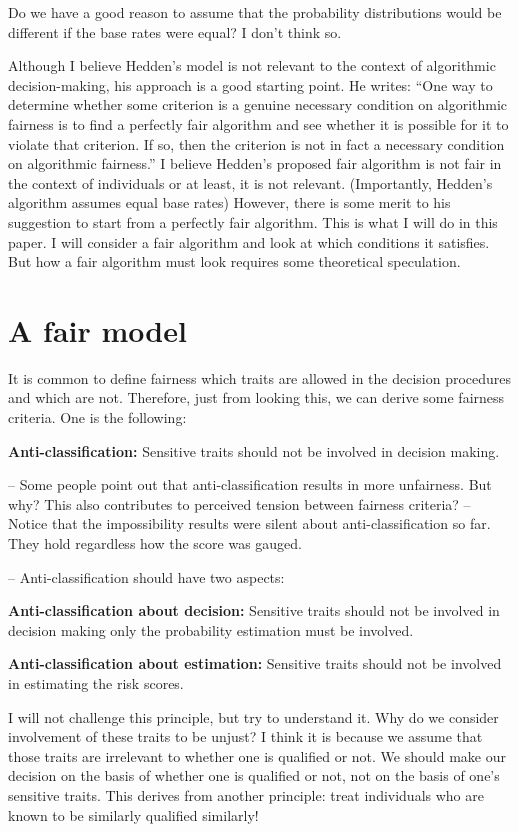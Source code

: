 \documentclass{article}
\begin{document}
Do we have a good reason to assume that the probability distributions would be different if the base rates were equal? I don't think so. 


Although I believe Hedden's model is not relevant to the context of algorithmic decision-making, his approach is a good starting point. He writes: “One way to determine whether some criterion is a genuine necessary condition on algorithmic fairness is to find a perfectly fair algorithm and see whether it is possible for it to violate that criterion. If so, then the criterion is not in fact a necessary condition on algorithmic fairness.” I believe Hedden’s proposed fair algorithm is not fair in the context of individuals or at least, it is not relevant. (Importantly, Hedden’s algorithm assumes equal base rates) However, there is some merit to his suggestion to start from a perfectly fair algorithm. This is what I will do in this paper. I will consider a fair algorithm and look at which conditions it satisfies. But how a fair algorithm must look requires some theoretical speculation.


\section{A fair model}

It is common to define fairness which traits are allowed in the decision procedures and which are not. Therefore, just from looking this, we can derive some fairness criteria. One is the following: 

 \textbf{Anti-classification:} Sensitive traits should not be involved in decision making. 

-- Some people point out that anti-classification results in more unfairness. But why? This also contributes to perceived tension between fairness criteria? 
-- Notice that the impossibility results were silent about anti-classification so far. They hold regardless how the score was gauged. 

-- Anti-classification should have two aspects:

\textbf{Anti-classification about decision:} Sensitive traits should not be involved in decision making only the probability estimation must be involved.

\textbf{Anti-classification about estimation:} Sensitive traits should not be involved in estimating the risk scores. 

I will not challenge this principle, but try to understand it. Why do we consider involvement of these traits to be unjust? I think it is because we assume that those traits are irrelevant to whether one is qualified or not. We should make our decision on the basis of whether one is qualified or not, not on the basis of one's sensitive traits. This derives from another principle: treat individuals who are known to be similarly qualified similarly!
\end{document}
